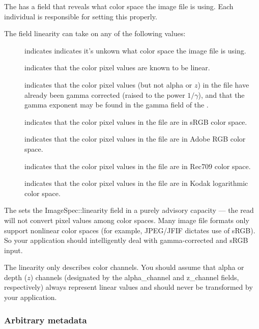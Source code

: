 The \ImageSpec has a field that reveals what color space the
image file is using.  Each individual \ImageInput is responsible for
setting this properly.

The \ImageSpec field {\cf linearity} can take on any of the
following values:
\begin{description}
\item[\halfspc \rm {}] indicates
  indicates it's unkown what color space the image file is using.
\item[\halfspc \rm {}] indicates that the
  color pixel values are known to be linear.
\item[\halfspc \rm {}] indicates
  that the color pixel values (but not alpha or $z$) in the file have
  already been gamma corrected (raised to the power $1/\gamma$), and
  that the gamma exponent may be found in the {\cf gamma} field of the
  \ImageSpec.
\item[\halfspc \rm {}] indicates that the
  color pixel values in the file are in sRGB color space.
\item[\halfspc \rm {}] indicates that the
  color pixel values in the file are in Adobe RGB color space.
\item[\halfspc \rm {}] indicates that the
  color pixel values in the file are in Rec709 color space.
\item[\halfspc \rm {}] indicates that the
  color pixel values in the file are in Kodak logarithmic color space.
\end{description}

The \ImageInput sets the {\cf ImageSpec::linearity} field in a
purely advisory capacity --- the {\cf read} will not convert pixel
values among color spaces.  Many image file formats only support
nonlinear color spaces (for example, JPEG/JFIF dictates use of sRGB).
So your application should intelligently deal with gamma-corrected and
sRGB input.

The linearity only describes color channels.  You should assume that
alpha or depth ($z$) channels (designated by the {\cf alpha_channel} and
{\cf z_channel} fields, respectively) always represent linear values and
should never be transformed by your application.

\subsubsection{Arbitrary metadata}

